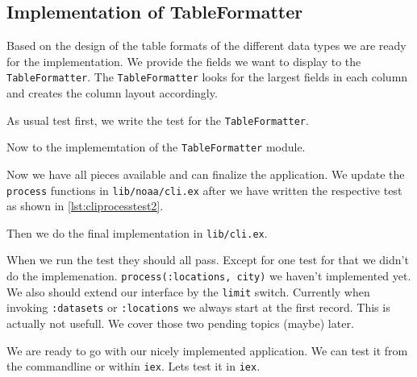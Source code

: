 \documentclass[10pt, a4paper]{article}
\newcommand{\includecode}[3]{}
\begin{document}
\subsection{Implementation of TableFormatter}
Based on the design of the table formats of the different data types we are
ready for the implementation. We provide the fields we want to display to
the \texttt{TableFormatter}. The \texttt{TableFormatter} looks for the 
largest fields in each column and creates the column layout accordingly.

As usual test first, we write the test for the \texttt{TableFormatter}.

\includecode{test/table\_formatter\_test.exs}{lst:tableformattertest}
            {listings/table-formatter-test.exs}

Now to the implememtation of the \texttt{TableFormatter} module.

\includecode{lib/noaa/table\_formatter.ex}{lst:tableformatter}
            {listings/table-formatter.ex}

Now we have all pieces available and can finalize the application. We update
the \texttt{process} functions in \texttt{lib/noaa/cli.ex} after we have
written the respective test as shown in \ref{lst:cliprocesstest2}.

\includecode{test/cli\_process\_test}{lst:cliprocesstest2}
            {listings/cli_process_test2.exs}

Then we do the final implementation in \texttt{lib/cli.ex}.

\includecode{lib/noaa/cli.ex}{lst:cli7}{listings/cli7.ex}

When we run the test they should all pass. Except for one test for that we
didn't do the implemenation. \texttt{process({:locations, city})} we haven't
implemented yet. We also should extend our interface by the \texttt{limit}
switch. Currently when invoking \texttt{:datasets} or \texttt{:locations} we
always start at the first record. This is actually not usefull. We cover 
those two pending topics (maybe) later.

We are ready to go with our nicely implemented application. We can test it 
from the commandline or within \texttt{iex}. Lets test it in \texttt{iex}.
\end{document}
